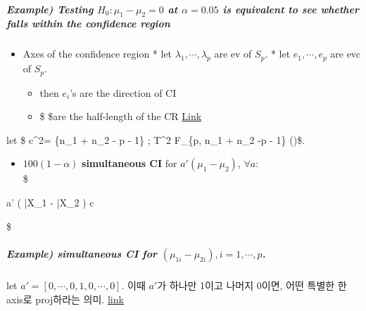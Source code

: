 \documentclass[
]{book}
\providecommand{\tightlist}{%
  \setlength{\itemsep}{0pt}\setlength{\parskip}{0pt}}
\begin{document}
{{{\hypertarget{example-testing-h_0-mu_1---mu_2-0-at-alpha0.05-is-equivalent-to-see-whether-falls-within-the-confidence-region}{%
\subparagraph{\texorpdfstring{Example) Testing \(H_0 : \mu_1 - \mu_2 = 0\) at \(\alpha=0.05\) is equivalent to see whether falls within the confidence region}{Example) Testing H\_0 : \textbackslash mu\_1 - \textbackslash mu\_2 = 0 at \textbackslash alpha=0.05 is equivalent to see whether falls within the confidence region}}\label{example-testing-h_0-mu_1---mu_2-0-at-alpha0.05-is-equivalent-to-see-whether-falls-within-the-confidence-region}}

\begin{itemize}
\tightlist
\item
  Axes of the confidence region
  * let \(\lambda_1 , \cdots, \lambda_p\) are ev of \(S_p\).
  * let \(e_1 , \cdots, e_p\) are evc of \(S_p\).

  \begin{itemize}
  \tightlist
  \item
    then \(e_i\)'s are the direction of CI
  \item
    \$  \$are the half-length of the CR \href{}{Link}
  \end{itemize}
\end{itemize}

let \$ c\^{}2=  \{n\_1 + n\_2 - p - 1\} ; T\^{}2  F\_\{p, n\_1 + n\_2 -p - 1\} (\alpha)\$.

\begin{itemize}
\tightlist
\item
  \(100(1-\alpha)%
  \) \textbf{simultaneous CI} for \(a'(\mu_1 - \mu_2)\), \(\forall a\):\\
  \$
\end{itemize}

a' \left( \bar X\_1 - \bar X\_2 \right) \pm c 

\$

\hypertarget{example-simultaneous-ci-for-mu_1i---mu_2i-i1-cdots-p.}{%
\subparagraph{\texorpdfstring{Example) simultaneous CI for \((\mu_{1i} - \mu_{2i}), i=1, \cdots, p\).}{Example) simultaneous CI for (\textbackslash mu\_\{1i\} - \textbackslash mu\_\{2i\}), i=1, \textbackslash cdots, p.}}\label{example-simultaneous-ci-for-mu_1i---mu_2i-i1-cdots-p.}}

let \(a' = \left[0, \cdots, 0, 1, 0, \cdots, 0 \right]\). 이때 \(a'\)가 하나만 1이고 나머지 0이면, 어떤 특별한 한 axis로 proj하라는 의미. \href{}{link}

}}}
\end{document}
